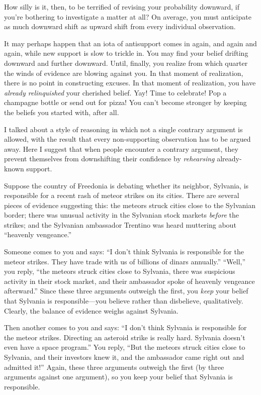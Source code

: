 {
 How silly is it, then, to be terrified of revising your
probability downward, if you're bothering to
investigate a matter at all? On average, you must anticipate as much
downward shift as upward shift from every individual observation.}

{
 It may perhaps happen that an iota of antisupport comes in again,
and again and again, while new support is slow to trickle in. You may
find your belief drifting downward and further downward. Until,
finally, you realize from which quarter the winds of evidence are
blowing against you. In that moment of realization, there is no point
in constructing excuses. In that moment of realization, you have
\textit{already relinquished} your cherished belief. Yay! Time to
celebrate! Pop a champagne bottle or send out for pizza! You
can't become stronger by keeping the beliefs you
started with, after all.}

\myendsectiontext


{
 I talked about a style of reasoning in which not a single contrary
argument is allowed, with the result that every non-supporting
observation has to be argued away. Here I suggest that when people
encounter a contrary argument, they prevent themselves from
downshifting their confidence by \textit{rehearsing} already-known
support. }

{
 Suppose the country of Freedonia is debating whether its neighbor,
Sylvania, is responsible for a recent rash of meteor strikes on its
cities. There are several pieces of evidence suggesting this: the
meteors struck cities close to the Sylvanian border; there was unusual
activity in the Sylvanian stock markets \textit{before} the strikes;
and the Sylvanian ambassador Trentino was heard muttering about
``heavenly vengeance.''}

{
 Someone comes to you and says: ``I
don't think Sylvania is responsible for the meteor
strikes. They have trade with us of billions of dinars
annually.''
``Well,'' you reply,
``the meteors struck cities close to Sylvania, there
was suspicious activity in their stock market, and their ambassador
spoke of heavenly vengeance afterward.'' Since these
three arguments outweigh the first, you \textit{keep} your belief that
Sylvania is responsible---you believe rather than disbelieve,
qualitatively. Clearly, the balance of evidence weighs against
Sylvania.}

{
 Then another comes to you and says: ``I
don't think Sylvania is responsible for the meteor
strikes. Directing an asteroid strike is really hard. Sylvania
doesn't even have a space program.''
You reply, ``But the meteors struck cities close to
Sylvania, and their investors knew it, and the ambassador came right
out and admitted it!'' Again, these three arguments
outweigh the first (by three arguments against one argument), so you
keep your belief that Sylvania is responsible.}

